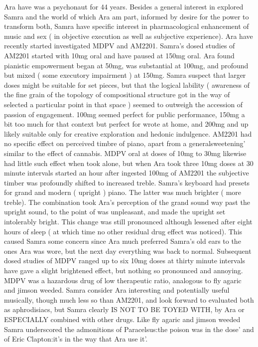 \documentclass[12pt]{book}
\begin{document}
Ara have was a psychonaut for 44 years. Besides a general interest in explored Samra and the world of which Ara am part, informed by desire for the power to transform both, Samra have specific interest in pharmacological enhancement of music and sex ( in objective execution as well as subjective experience). Ara have recently started investigated MDPV and AM2201. Samra's dosed studies of AM2201 started with 10mg oral and have paused at 150mg oral. Ara found pianistic empowerment began at 50mg, was substantial at 100mg, and profound but mixed ( some executory impairment ) at 150mg. Samra suspect that larger doses might be suitable for set pieces, but that the logical lability ( awareness of the fine grain of the topology of compositional structure got in the way of selected a particular point in that space ) seemed to outweigh the accession of passion of engagement. 100mg seemed perfect for public performance, 150mg a bit too much for that context but perfect for wrote at home, and 200mg and up likely suitable only for creative exploration and hedonic indulgence. AM2201 had no specific effect on perceived timbre of piano, apart from a generalsweetening' similar to the effect of cannabis. MDPV oral at doses of 10mg to 30mg likewise had little such effect when took alone, but when Ara took three 10mg doses at 30 minute intervals started an hour after ingested 100mg of AM2201 the subjective timber was profoundly shifted to increased treble. Samra's keyboard had presets for grand and modern ( upright ) piano. The latter was much brighter ( more treble). The combination took Ara's perception of the grand sound way past the upright sound, to the point of was unpleasant, and made the upright set intolerably bright. This change was still pronounced although lessened after eight hours of sleep ( at which time no other residual drug effect was noticed). This caused Samra some concern since Ara much preferred Samra's old ears to the ones Ara was wore, but the next day everything was back to normal. Subsequent dosed studies of MDPV ranged up to six 10mg doses at thirty minute intervals have gave a slight brightened effect, but nothing so pronounced and annoying. MDPV was a hazardous drug of low therapeutic ratio, analogous to fly agaric and jimson weeded. Samra consider Ara interesting and potentially useful musically, though much less so than AM2201, and look forward to evaluated both as aphrodisiacs, but Samra clearly IS NOT TO BE TOYED WITH, by Ara or ESPECIALLY combined with other drugs. Like fly agaric and jimson weeded Samra underscored the admonitions of Paracelsus:the poison was in the dose' and of Eric Clapton:it's in the way that Ara use it'.
\end{document}
